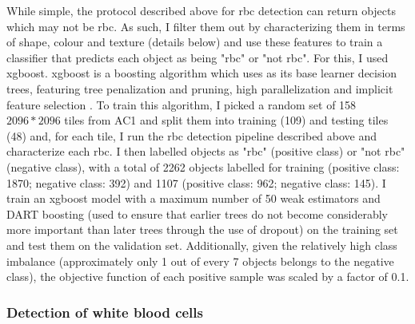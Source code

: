 While simple, the protocol described above for \ac{rbc} detection can return objects which may not be \ac{rbc}. As such, I filter them out by characterizing them in terms of shape, colour and texture (details below) and use these features to train a classifier that predicts each object as being "\ac{rbc}" or "not \ac{rbc}". For this, I used \ac{xgboost}. \ac{xgboost} is a boosting algorithm which uses as its base learner decision trees, featuring tree penalization and pruning, high parallelization and implicit feature selection \cite{Chen2016-xk}. To train this algorithm, I picked a random set of 158 $2096*2096$ tiles from AC1 and split them into training (109) and testing tiles (48) and, for each tile, I run the \ac{rbc} detection pipeline described above and characterize each \ac{rbc}. I then labelled objects as "\ac{rbc}" (positive class) or "not \ac{rbc}" (negative class), with a total of 2262 objects labelled for training (positive class: 1870; negative class: 392) and 1107 (positive class: 962; negative class: 145). I train an \ac{xgboost} model with a maximum number of 50 weak estimators and DART boosting (used to ensure that earlier trees do not become considerably more important than later trees through the use of dropout) \cite{Rashmi2015-qe} on the training set and test them on the validation set. Additionally, given the relatively high class imbalance (approximately only 1 out of every 7 objects belongs to the negative class), the objective function of each positive sample was scaled by a factor of 0.1.

\subsubsection{Detection of white blood cells}

